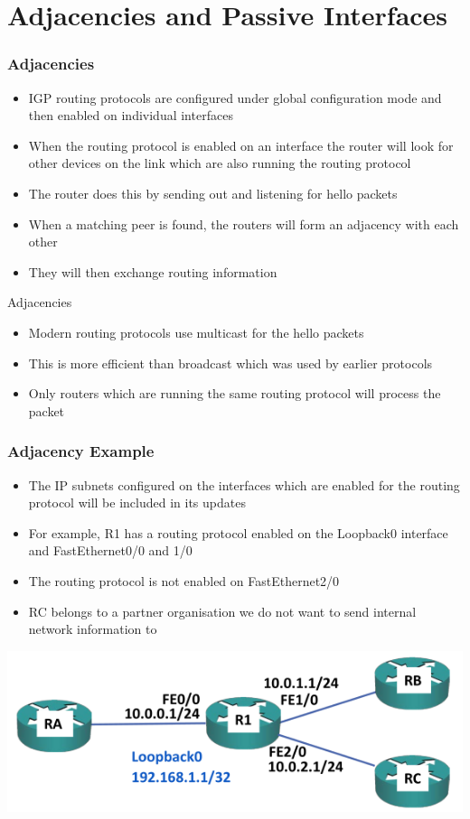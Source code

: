 \documentclass[pdflatex,compress,mathserif]{beamer}
\begin{document}
\section{Adjacencies and Passive Interfaces}

\begin{frame}
	\frametitle{Adjacencies}
	\begin{itemize}
		\item IGP routing protocols are configured under global configuration mode
and then enabled on individual interfaces
		\item When the routing protocol is enabled on an interface the router will look
for other devices on the link which are also running the routing protocol
		\item The router does this by sending out and listening for hello packets
		\item When a matching peer is found, the routers will form an adjacency with
each other
		\item They will then exchange routing information
	\end{itemize}
\end{frame}

\begin{frame}{Adjacencies}
	\begin{itemize}
		\item Modern routing protocols use multicast for the hello packets
		\item This is more efficient than broadcast which was used by earlier protocols
		\item Only routers which are running the same routing protocol will process
the packet
	\end{itemize}
\end{frame}

\begin{frame}
	\frametitle{Adjacency Example}
	\begin{itemize}
		\item The IP subnets configured on the interfaces which are enabled for the
routing protocol will be included in its updates
		\item For example, R1 has a routing protocol enabled on the Loopback0
interface and FastEthernet0/0 and 1/0
		\item The routing protocol is not enabled on FastEthernet2/0
		\item RC belongs to a partner organisation we do not want to send internal
network information to
	\end{itemize}
	\begin{center}
		\includegraphics[width=0.6\linewidth]{img/img36}
	\end{center}
\end{frame}
\end{document}
